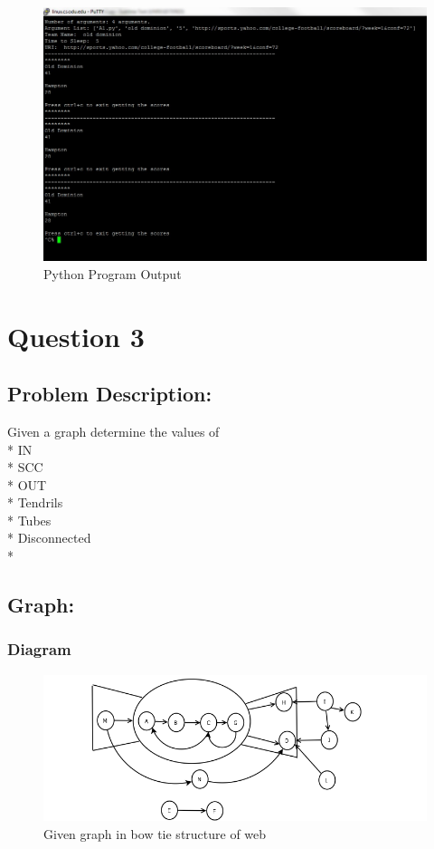 \documentclass[12pt]{article}
\begin{document}
\begin{figure}[ht]
\includegraphics[scale=0.7]{programOutput}
\centering
\caption{Python Program Output}
\end{figure}
\newpage
\section{Question 3}
\subsection{Problem Description:}
Given a graph determine the values of \\*
IN\\*
SCC\\*
OUT\\*
Tendrils\\*
Tubes\\*
Disconnected\\*
\subsection{Graph:}
\subsubsection{Diagram}
\begin{figure}[ht]
\includegraphics[scale=0.6]{graph}
\caption{Given graph in bow tie structure of web}
\centering
\end{figure}
\end{document}
